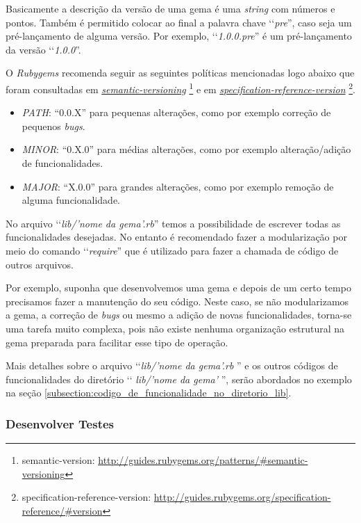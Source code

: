 Basicamente a descrição da versão de uma gema é uma \emph{string} com números e pontos. Também é permitido
colocar ao final a palavra chave ‘‘\emph{pre}'', caso seja um pré-lançamento de alguma versão.
Por exemplo, ‘‘\emph{1.0.0.pre}'' é um pré-lançamento da versão ‘‘\emph{1.0.0}''.

O \emph{Rubygems} recomenda seguir as seguintes políticas mencionadas logo abaixo que foram consultadas
em \emph{\href{http://guides.rubygems.org/patterns/\#semantic-versioning}{semantic-versioning}}
\footnote{semantic-version: \url{http://guides.rubygems.org/patterns/\#semantic-versioning}} e em
\emph{\href{http://guides.rubygems.org/specification-reference/\#version}{specification-reference-version}}
\footnote{specification-reference-version: \url{http://guides.rubygems.org/specification-reference/\#version}}.

\begin{itemize}
 \item \emph{PATH}: “0.0.X” para pequenas alterações, como por exemplo correção de pequenos \emph{bugs}.
 \item \emph{MINOR}: “0.X.0” para médias alterações, como por exemplo alteração/adição de funcionalidades.
 \item \emph{MAJOR}: “X.0.0” para grandes alterações, como por exemplo remoção de alguma funcionalidade.
\end{itemize}


No arquivo ‘‘\emph{lib/'nome da gema'.rb}'' temos a possibilidade de escrever todas as
funcionalidades desejadas. No entanto é recomendado fazer a modularização por meio do comando
 ‘‘\emph{require}'' que é utilizado para fazer a chamada de código de outros
arquivos.

Por exemplo, suponha que desenvolvemos uma gema e depois de um certo tempo precisamos fazer a manutenção do
seu código. Neste caso, se não modularizamos a gema, a correção de \emph{bugs} ou mesmo a adição de
novas funcionalidades, torna-se uma tarefa muito complexa, pois não existe nenhuma organização
estrutural na gema preparada para facilitar esse tipo de operação.

Mais detalhes sobre o arquivo ‘‘\emph{lib/'nome da gema'.rb} '' e os outros códigos de funcionalidades do
diretório ‘‘ \emph{lib/'nome da gema'} '', serão abordados no exemplo na seção
\ref{subsection:codigo_de_funcionalidade_no_diretorio_lib}.


\subsubsection{Desenvolver Testes}
\label{subsubsection:desenvolver_testes}


